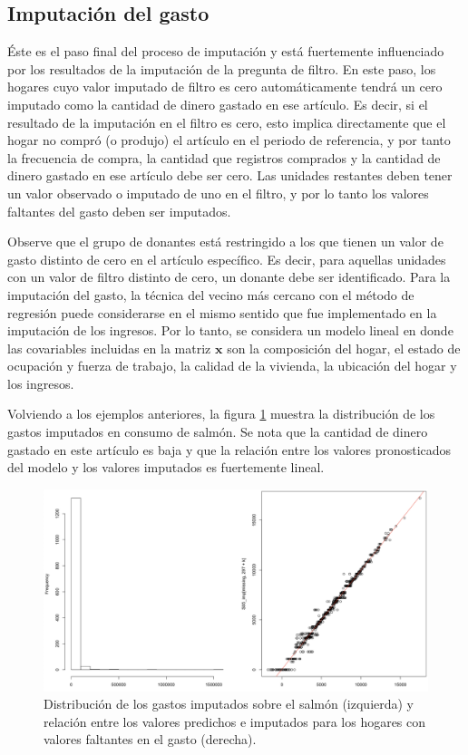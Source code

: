 \documentclass[
  12pt,
]{book}
\begin{document}
\hypertarget{imputaciuxf3n-del-gasto}{%
\subsection{Imputación del gasto}\label{imputaciuxf3n-del-gasto}}

Éste es el paso final del proceso de imputación y está fuertemente influenciado por los resultados de la imputación de la pregunta de filtro. En este paso, los hogares cuyo valor imputado de filtro es cero automáticamente tendrá un cero imputado como la cantidad de dinero gastado en ese artículo. Es decir, si el resultado de la imputación en el filtro es cero, esto implica directamente que el hogar no compró (o produjo) el artículo en el periodo de referencia, y por tanto la frecuencia de compra, la cantidad que registros comprados y la cantidad de dinero gastado en ese artículo debe ser cero. Las unidades restantes deben tener un valor observado o imputado de uno en el filtro, y por lo tanto los valores faltantes del gasto deben ser imputados.

Observe que el grupo de donantes está restringido a los que tienen un valor de gasto distinto de cero en el artículo específico. Es decir, para aquellas unidades con un valor de filtro distinto de cero, un donante debe ser identificado. Para la imputación del gasto, la técnica del vecino más cercano con el método de regresión puede considerarse en el mismo sentido que fue implementado en la imputación de los ingresos. Por lo tanto, se considera un modelo lineal en donde las covariables incluidas en la matriz \(\mathbf{x}\) son la composición del hogar, el estado de ocupación y fuerza de trabajo, la calidad de la vivienda, la ubicación del hogar y los ingresos.

Volviendo a los ejemplos anteriores, la figura \ref{fig:fig13} muestra la distribución de los gastos imputados en consumo de salmón. Se nota que la cantidad de dinero gastado en este artículo es baja y que la relación entre los valores pronosticados del modelo y los valores imputados es fuertemente lineal.

\begin{figure}
\includegraphics[width=0.5\linewidth]{Pics/13} \caption{Distribución de los gastos imputados sobre el salmón (izquierda) y relación entre los valores predichos e imputados para los hogares con valores faltantes en el gasto (derecha).}\label{fig:fig13}
\end{figure}
\end{document}
